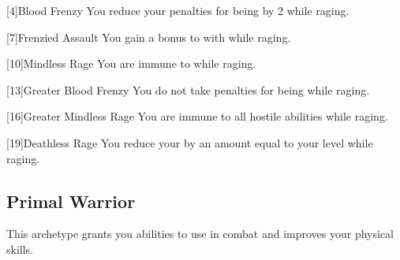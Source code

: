         [4]{Blood Frenzy}
        You reduce your penalties for being  by 2 while raging.

        [7]{Frenzied Assault}
        You gain a  bonus to  with  while raging.

        [10]{Mindless Rage}
        You are immune to   while raging.

        [13]{Greater Blood Frenzy} 
        You do not take penalties for being  while raging.

        [16]{Greater Mindless Rage} 
        You are immune to all hostile  abilities while raging.

        [19]{Deathless Rage} 
        You reduce your  by an amount equal to your level while raging.

    \subsection{Primal Warrior}
        This archetype grants you abilities to use in combat and improves your physical skills.

